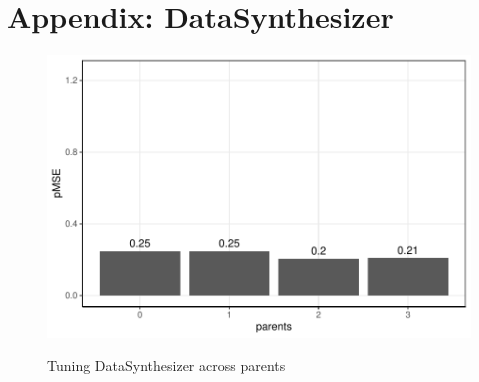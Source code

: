 
%     


\section{Appendix: DataSynthesizer}\label{appendix:datasynethsizer}
\setcounter{figure}{0}    
\setcounter{table}{0}    
\renewcommand*\thetable{\Alph{section}.\arabic{table}}
\renewcommand*\thefigure{\Alph{section}.\arabic{figure}}
\renewcommand{\theHfigure}{\Alph{section}.\arabic{table}}
\renewcommand{\theHtable}{\Alph{section}.\arabic{figure}}

\begin{figure}[ht]
  \caption{Tuning DataSynthesizer across parents}
  \label{fig:tuning_ds}
  \centering
  \includegraphics[width=\linewidth]{../graphs/datasynthesizer/datasynthesizer_fidelity_optimize_dataset_parents.pdf}
  \label{fig:tuning_ds_dataset}
\end{figure}

